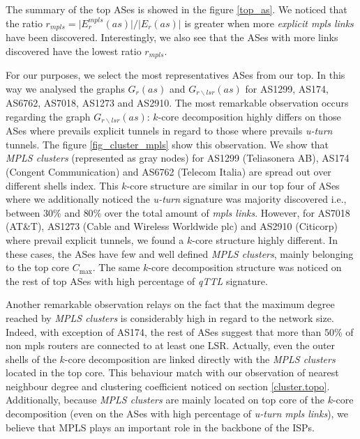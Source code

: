 The summary of the top ASes is showed in the figure \ref{top_as}. We noticed that the
ratio $r_{mpls}= \vert E^{mpls}_{r} (as) \vert /\vert E_{r} (as) \vert $  is greater when more  \textit{explicit mpls links} have
been discovered. Interestingly, we also see that the ASes with more
links discovered have the lowest ratio $r_{mpls}$. 

For our purposes, we select the most representatives ASes from our top. In this way we analysed the graphs $G_{r}(as)$ and $G_{r\backslash lsr}(as)$ for AS1299, AS174, AS6762, AS7018, AS1273 and AS2910. The most remarkable
observation occurs regarding the graph $G_{r\backslash lsr}(as)$: $k$-core decomposition highly differs on those ASes where prevails explicit tunnels in regard to those where prevails \textit{u-turn} tunnels. The figure \ref{fig_cluster_mpls} show this observation.  We show that \textit{MPLS clusters} (represented as gray nodes) for  AS1299 (Teliasonera AB), AS174 (Congent Communication) and AS6762 (Telecom Italia) are spread out over different shells index. This $k$-core structure are similar in our top four of ASes where we additionally noticed  the \textit{u-turn} signature was majority discovered i.e., between $30\%$ and  $80\%$ over  the total amount of \textit{mpls links}. However, for AS7018 (AT\&T), AS1273 (Cable and Wireless Worldwide plc) and AS2910 (Citicorp) where prevail explicit tunnels, we found a $k$-core
structure highly different.  In these cases,  the ASes have few
and well defined \textit{MPLS clusters}, mainly belonging to the top core $C_{\max}$. The same $k$-core decomposition structure was noticed  on the rest of top ASes with high percentage of \textit{qTTL} signature. 

Another remarkable observation  relays on the fact that the maximum degree reached by \textit{MPLS clusters} is considerably high in regard to the network size. Indeed, with exception of AS174, the rest of
ASes suggest that more than $50\%$ of non mpls routers are connected  to at
least one LSR. Actually, even the outer shells of the $k$-core decomposition are
linked directly with the \textit{MPLS clusters} located in the top core. This behaviour match with our observation of nearest neighbour degree and clustering coefficient noticed on section \ref{cluster.topo}. Additionally, because \textit{MPLS clusters} are mainly located on top core of the $k$-core decomposition (even on the ASes with high percentage of \textit{u-turn mpls links}), we believe that MPLS plays an important role in the backbone of the ISPs.

